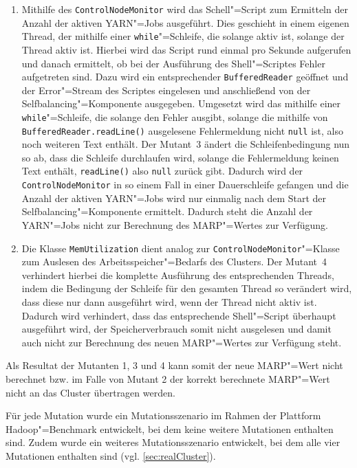 \begin{enumerate}[itemsep=5pt]
    \item
    Mithilfe des \texttt{ControlNodeMonitor} wird das Schell"=Script zum Ermitteln der Anzahl der aktiven YARN"=Jobs ausgeführt.
    Dies geschieht in einem eigenen Thread, der mithilfe einer \texttt{while}"=Schleife, die solange aktiv ist, solange der Thread aktiv ist.
    Hierbei wird das Script rund einmal pro Sekunde aufgerufen und danach ermittelt, ob bei der Ausführung des Shell"=Scriptes Fehler aufgetreten sind.
    Dazu wird ein entsprechender \texttt{BufferedReader} geöffnet und der Error"=Stream des Scriptes eingelesen und anschließend von der Selfbalancing"=Komponente ausgegeben.
    Umgesetzt wird das mithilfe einer \texttt{while}"=Schleife, die solange den Fehler ausgibt, solange die mithilfe von \texttt{BufferedReader.readLine()} ausgelesene Fehlermeldung nicht \texttt{null} ist, also noch weiteren Text enthält.
    Der Mutant~3 ändert die Schleifenbedingung nun so ab, dass die Schleife durchlaufen wird, solange die Fehlermeldung keinen Text enthält, \texttt{readLine()} also \texttt{null} zurück gibt.
    Dadurch wird der \texttt{ControlNodeMonitor} in so einem Fall in einer Dauerschleife gefangen und die Anzahl der aktiven YARN"=Jobs wird nur einmalig nach dem Start der Selfbalancing"=Komponente ermittelt.
    Dadurch steht die Anzahl der YARN"=Jobs nicht zur Berechnung des \gls{MARP}"=Wertes zur Verfügung.
            
    \item
    Die Klasse \texttt{MemUtilization} dient analog zur \texttt{ControlNodeMonitor}"=Klasse zum Auslesen des Arbeitsspeicher"=Bedarfs des Clusters.
    Der Mutant~4 verhindert hierbei die komplette Ausführung des entsprechenden Threads, indem die Bedingung der Schleife für den gesamten Thread so verändert wird, dass diese nur dann ausgeführt wird, wenn der Thread nicht aktiv ist.
    Dadurch wird verhindert, dass das entsprechende Shell"=Script überhaupt ausgeführt wird, der Speicherverbrauch somit nicht ausgelesen und damit auch nicht zur Berechnung des neuen \gls{MARP}"=Wertes zur Verfügung steht.
\end{enumerate}

Als Resultat der Mutanten 1, 3 und 4 kann somit der neue \gls{MARP}"=Wert nicht berechnet bzw. im Falle von Mutant 2 der korrekt berechnete \gls{MARP}"=Wert nicht an das Cluster übertragen werden.

Für jede Mutation wurde ein Mutationsszenario im Rahmen der Plattform Hadoop"=Benchmark entwickelt, bei dem keine weitere Mutationen enthalten sind.
Zudem wurde ein weiteres Mutationsszenario entwickelt, bei dem alle vier Mutationen enthalten sind (vgl. \cref{sec:realCluster}).
